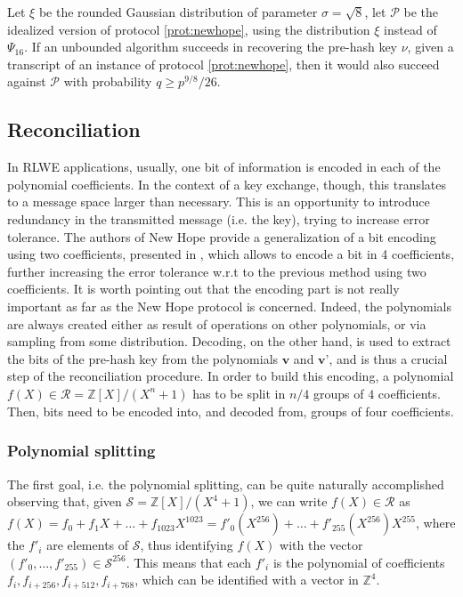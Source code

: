 \begin{theorem}\label{thm:bin_f_bound}
Let $\xi$ be the rounded Gaussian distribution of parameter $\sigma = \sqrt{8}$, let $\mathscr{P}$ be the idealized version of protocol \ref{prot:newhope}, using the distribution $\xi$ instead of $\Psi_{16}$. If an unbounded algorithm succeeds in recovering the pre-hash key $\nu$, given a transcript of an instance of protocol \ref{prot:newhope}, then it would also succeed against $\mathscr{P}$ with probability $q\ge p^{9/8}/26$.
\end{theorem}

\subsection{Reconciliation}
In RLWE applications, usually, one bit of information is encoded in each of the polynomial coefficients. In the context of a key exchange, though, this translates to a message space larger than necessary. This is an opportunity to introduce redundancy in the transmitted message (i.e. the key), trying to increase error tolerance. The authors of New Hope provide a generalization of a bit encoding using two coefficients, presented in \cite{bit_encoding}, which allows to encode a bit in 4 coefficients, further increasing the error tolerance w.r.t to the previous method using two coefficients. It is worth pointing out that the encoding part is not really important as far as the New Hope protocol is concerned. Indeed, the polynomials are always created either as result of operations on other polynomials, or via sampling from some distribution. Decoding, on the other hand, is used to extract the bits of the pre-hash key from the polynomials $\textbf{v}$ and $\textbf{v'}$, and is thus a crucial step of the reconciliation procedure. In order to build this encoding, a polynomial $f(X) \in \mathscr{R} = \mathbb{Z}[X]/(X^n+1)$ has to be split in $n/4$ groups of $4$ coefficients. Then, bits need to be encoded into, and decoded from, groups of four coefficients.

\subsubsection{Polynomial splitting}
The first goal, i.e. the polynomial splitting, can be quite naturally accomplished observing that, given $\mathscr{S} = \mathbb{Z}[X]/(X^4+1)$, we can write $f(X) \in \mathscr{R}$ as $f(X) = f_0 + f_1X + \ldots + f_{1023}X^{1023} = f'_0(X^{256}) + \ldots + f'_{255}(X^{256})X^{255}$, where the $f'_i$ are elements of $\mathscr{S}$, thus identifying $f(X)$ with the vector $(f'_0,\ldots,f'_{255}) \in \mathscr{S}^{256}$. This means that each $f'_i$ is the polynomial of coefficients $f_i,f_{i+256},f_{i+512},f_{i+768}$, which can be identified with a vector in $\mathbb{Z}^4$.

